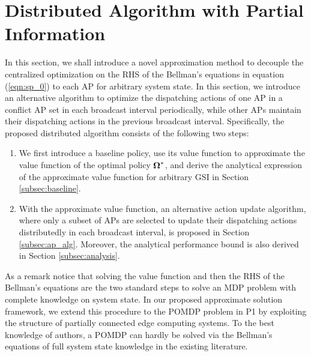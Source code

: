 \section{Distributed Algorithm with Partial Information}
\label{sec:algorithm}

In this section, we shall introduce a novel approximation method to decouple the centralized optimization on the RHS of the Bellman's equations in equation (\ref{eqn:sp_0}) to each AP for arbitrary system state.
In this section, we introduce an alternative algorithm to optimize the dispatching actions of one AP in a conflict AP set in each broadcast interval periodically, while other APs maintain their dispatching actions in the previous broadcast interval.
Specifically, the proposed distributed algorithm consists of the following two steps:
\begin{enumerate}
    \item We first introduce a baseline policy, use its value function to approximate the value function of the optimal policy $\boldsymbol{\Omega}^*$, and derive the analytical expression of the approximate value function for arbitrary GSI in Section \ref{subsec:baseline}.
    \item With the approximate value function, an alternative action update algorithm, where only a subset of APs are selected to update their dispatching actions distributedly in each broadcast interval, is proposed in Section \ref{subsec:ap_alg}.
    Moreover, the analytical performance bound is also derived in Section \ref{subsec:analysis}.
\end{enumerate}
As a remark notice that solving the value function and then the RHS of the Bellman's equations are the two standard steps to solve an MDP problem with complete knowledge on system state.
In our proposed approximate solution framework, we extend this procedure to the POMDP problem in P1 by exploiting the structure of partially connected edge computing systems.
To the best knowledge of authors, a POMDP can hardly be solved via the Bellman's equations of full system state knowledge in the existing literature.

